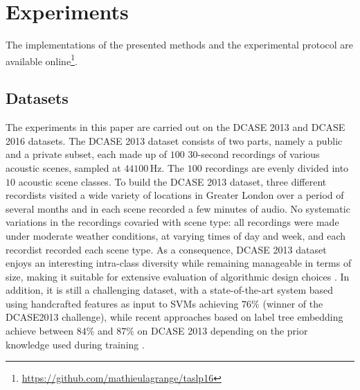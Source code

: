 \documentclass[journal]{IEEEtran}
\newcommand{\ja}[1]{\textcolor{magenta}{Joakim : #1}}
\begin{document}
\section{Experiments}
\label{sec:experiments}

The implementations of the presented methods and the experimental protocol are available online\footnote{\url{https://github.com/mathieulagrange/taslp16}}. %


\subsection{Datasets}

The experiments in this paper are carried out on the DCASE 2013 \cite{7100934} and DCASE 2016 \cite{Mesaros2016_EUSIPCO} datasets.
The DCASE 2013 dataset consists of two parts, namely a public and a private subset, each made up of $100$ $30$-second recordings of various acoustic scenes, sampled at $44100\,\mathrm{Hz}$. The $100$ recordings are evenly divided into $10$ acoustic scene classes. To build the DCASE 2013 dataset, three different recordists visited a wide variety of locations in Greater London over a period of several months and in each scene recorded a few minutes of audio. No
systematic variations in the recordings covaried with scene
type: all recordings were made under moderate weather conditions, at varying times of day and week, and each recordist recorded each scene type. As a consequence, DCASE 2013 dataset enjoys an interesting intra-class diversity while remaining manageable in terms of size, making it suitable for extensive evaluation of algorithmic design choices \cite{lagrange:hal-01082501}.
In addition, it is still a challenging dataset, with a state-of-the-art system based using handcrafted features as input to SVMs achieving $76\%$ \cite{roma2013} (winner of the DCASE2013 challenge), while recent approaches based on label tree embedding achieve between $84\%$ and $87\%$ on DCASE 2013 depending on the prior knowledge used during training \cite{phan2016label}.

\end{document}
